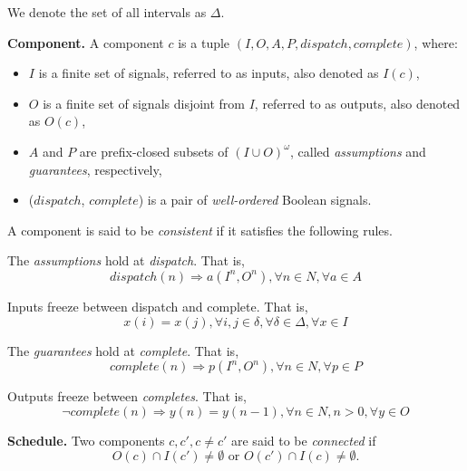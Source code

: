 We denote the set of all intervals as $\Delta$.

{\bf Component.}
A component $c$ is a tuple $(I, O, A, P, dispatch, complete)$, where: 

\begin{itemize}
    	\item $I$ is a finite set of signals, referred to as inputs, also denoted as $I(c)$,
    	\item $O$ is a finite set of signals disjoint from $I$, referred to as outputs, also denoted as $O(c)$,
	\item $A$ and $P$ are prefix-closed subsets of $(I \cup O)^\omega$, called \emph{assumptions} and \emph{guarantees}, respectively,
    	\item ($dispatch$, $complete$) is a pair of \emph{well-ordered} Boolean signals.
\end{itemize}

A component is said to be \emph{consistent} if it satisfies the following rules.

The \emph{assumptions} hold at \emph{dispatch}. That is,
\begin{equation*} 
\label{eqn:assumption}
	dispatch(n) \Rightarrow a(I^n, O^n), \forall n\in N, \forall a \in A
\end{equation*}

Inputs freeze between dispatch and complete. That is,
\begin{equation*} 
\label{eqn:inputfreeze}
	x(i) = x(j), \forall i,j\in \delta, \forall \delta \in \Delta, \forall x \in I
\end{equation*}

The \emph{guarantees} hold at \emph{complete}. That is,
\begin{equation*} 
\label{eqn:guarantee}
	complete(n) \Rightarrow p(I^n, O^n), \forall n\in N, \forall p \in P
\end{equation*}


Outputs freeze between \emph{completes}. That is,
\begin{equation*} 
\label{eqn:outputfreeze}
\lnot complete(n) \Rightarrow y(n) = y(n-1), \forall n \in N, n>0, \forall y \in O
\end{equation*}

{\bf Schedule.}
Two components $ c, c', c\neq c'$ are said to be \emph{connected} if
\begin{equation*}
	O(c) \cap I(c') \neq \emptyset \text{ or } O(c') \cap I(c) \neq \emptyset.
\end{equation*}

